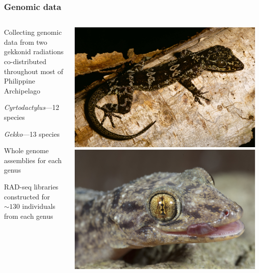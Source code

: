 \begin{frame}
    \frametitle{Genomic data}
    \begin{columns}[c]
        \begin{myitemize}
            \item Collecting genomic data from two gekkonid radiations
                co-distributed throughout most of Philippine Archipelago
            \begin{myitemize}
                \item \emph{Cyrtodactylus}---12 species
                \item \emph{Gekko}---13 species
            \end{myitemize}
            \item Whole genome assemblies for each genus
            \item RAD-seq libraries constructed for $\sim130$ individuals
                from each genus
        \end{myitemize}
        \includegraphics[width=\textwidth]{images/cyrt-agusanensis.jpg} \quad
        \includegraphics[width=\textwidth]{images/gekko-mindorensis.jpg}
    \end{columns}
\end{frame}


